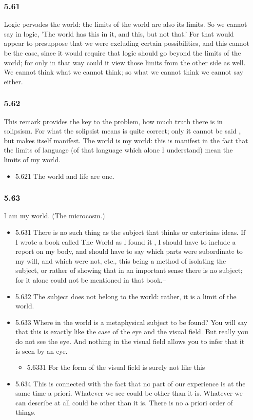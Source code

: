 \documentclass[11pt]{article}
\begin{document}
\subsubsection*{5.61}
\label{sec:orgd2e32b7}
Logic pervades the world: the limits of the world are also its limits.
So we cannot say in logic, 'The world has this in it, and this, but not
that.' For that would appear to presuppose that we were excluding certain
possibilities, and this cannot be the case, since it would require that
logic should go beyond the limits of the world; for only in that way could
it view those limits from the other side as well. We cannot think what we
cannot think; so what we cannot think we cannot say either.
\subsubsection*{5.62}
\label{sec:orga2827f8}
This remark provides the key to the problem, how much truth there is
in solipsism. For what the solipsist means is quite correct; only it cannot
be said , but makes itself manifest. The world is my world: this is
manifest in the fact that the limits of language (of that language which
alone I understand) mean the limits of my world.
\begin{itemize}
\item 5.621
\label{sec:org8d1c0c6}
The world and life are one.
\end{itemize}
\subsubsection*{5.63}
\label{sec:org1965545}
I am my world. (The microcosm.)
\begin{itemize}
\item 5.631
\label{sec:orgeff2820}
There is no such thing as the subject that thinks or entertains
ideas. If I wrote a book called The World as l found it , I should have to
include a report on my body, and should have to say which parts were
subordinate to my will, and which were not, etc., this being a method of
isolating the subject, or rather of showing that in an important sense
there is no subject; for it alone could not be mentioned in that book.--
\item 5.632
\label{sec:org11fd29e}
The subject does not belong to the world: rather, it is a limit of
the world.
\item 5.633
\label{sec:org4f6b045}
Where in the world is a metaphysical subject to be found? You will
say that this is exactly like the case of the eye and the visual field. But
really you do not see the eye. And nothing in the visual field allows you
to infer that it is seen by an eye.
\begin{itemize}
\item 5.6331
\label{sec:org9dd79bd}
For the form of the visual field is surely not like this
\end{itemize}
\item 5.634
\label{sec:orgab21175}
This is connected with the fact that no part of our experience is at
the same time a priori. Whatever we see could be other than it is. Whatever
we can describe at all could be other than it is. There is no a priori
order of things.
\end{itemize}
\end{document}
